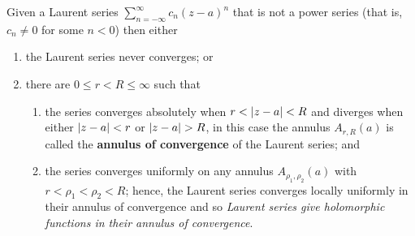 \begin{proposition}[]
    Given a Laurent series 
    $\sum_{n=-\infty}^\infty c_n(z-a)^n$
    that is not a power series
    (that is, $c_n \neq 0$ for some $n < 0$)
    then either
    \begin{enumerate}
        \item the Laurent series never converges; or
        \item there are $0 \leq r < R \leq \infty$
            such that
            \begin{enumerate}
                \item the series converges absolutely when
                    $r < \left\lvert z-a\right\rvert < R$ and diverges when
                    either $\left\lvert z-a\right\rvert < r$ or
                    $\left\lvert z-a\right\rvert > R$,
                    in this case the annulus $A_{r,R}(a)$
                    is called the \textbf{annulus of convergence}
                    of the Laurent series; and
                    
                \item the series converges uniformly on any annulus
                    $A_{\rho_1,\rho_2}(a)$ with
                    $r < \rho_1 < \rho_2 < R$;
                    hence, the Laurent series converges
                    locally uniformly in their annulus of convergence
                    and so \emph{Laurent series give holomorphic functions
                    in their annulus of convergence}.
            \end{enumerate}
    \end{enumerate}
\end{proposition}

